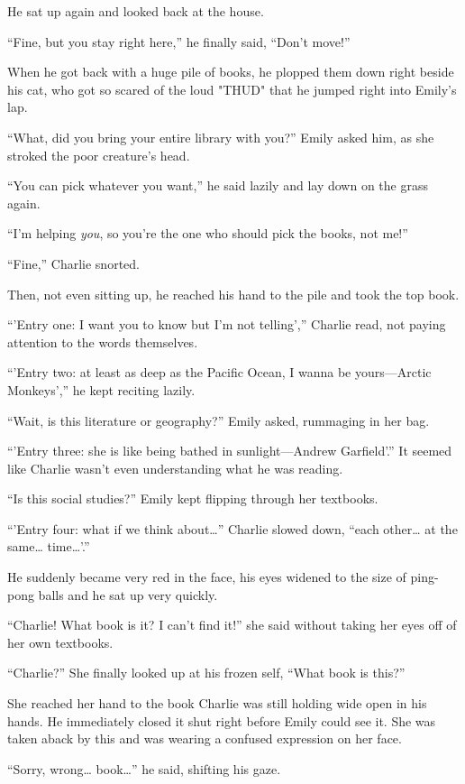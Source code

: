 He sat up again and looked back at the house.

“Fine, but you stay right here,” he finally said, “Don't move!”

\bigskip

When he got back with a huge pile of books, he plopped them down right beside his cat, who got so scared of the loud "THUD" that he jumped right into Emily's lap.

“What, did you bring your entire library with you?” Emily asked him, as she stroked the poor creature's head.

“You can pick whatever you want,” he said lazily and lay down on the grass again.

“I'm helping \textit{you}, so you're the one who should pick the books, not me!”

“Fine,” Charlie snorted.

Then, not even sitting up, he reached his hand to the pile and took the top book.

“'Entry one: I want you to know but I'm not telling',” Charlie read, not paying attention to the words themselves.

“'Entry two: at least as deep as the Pacific Ocean, I wanna be yours—Arctic Monkeys',” he kept reciting lazily.

“Wait, is this literature or geography?” Emily asked, rummaging in her bag.

“'Entry three: she is like being bathed in sunlight—Andrew Garfield'.” It seemed like Charlie wasn't even understanding what he was reading.

“Is this social studies?” Emily kept flipping through her textbooks.

“'Entry four: what if we think about…” Charlie slowed down, “each other… at the same… time…'.”

He suddenly became very red in the face, his eyes widened to the size of ping-pong balls and he sat up very quickly.

“Charlie! What book is it? I can't find it!” she said without taking her eyes off of her own textbooks.

“Charlie?” She finally looked up at his frozen self, “What book is this?”

She reached her hand to the book Charlie was still holding wide open in his hands. He immediately closed it shut right before Emily could see it. She was taken aback by this and was wearing a confused expression on her face.

“Sorry, wrong… book…” he said, shifting his gaze.

